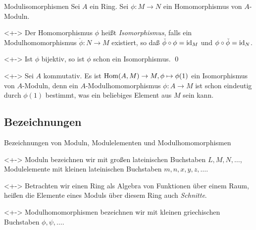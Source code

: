 \begin{frame}{Modulisomorphismen}
	Sei \(A\) ein Ring. Sei \(\phi\colon M \to N\) ein Homomorphismus
	von \(A\)-Moduln.
	\begin{definition}<+->
		Der Homomorphismus \(\phi\) heißt \emph{Isomorphismus}, falls ein
		Modulhomomorphismus \(\check \phi\colon N \to M\) existiert, so daß
		\(\check \phi \circ \phi = \operatorname{id}_M\) und \(\phi \circ \check \phi = \operatorname{id}_N\).
	\end{definition}
	\begin{proposition}<+->
		Ist \(\phi\) bijektiv, so ist \(\phi\) schon ein Isomorphismus.
		\qed
	\end{proposition}
	\begin{example}<+->
		Sei \(A\) kommutativ. Es ist
		\(\operatorname{Hom}(A, M) \to M, \phi \mapsto \phi(1)\)
		ein Isomorphismus von \(A\)-Moduln, denn ein \(A\)-Modulhomomorphismus
		\(\phi\colon A \to M\) ist schon eindeutig durch \(\phi(1)\) bestimmt, was
		ein beliebiges Element aus \(M\) sein kann.
	\end{example}
\end{frame}

\subsection{Bezeichnungen}

\begin{frame}{Bezeichnungen von Moduln, Modulelementen und Modulhomomorphismen}
	\begin{convention}<+->
		Moduln bezeichnen wir mit großen lateinischen Buchstaben \(L, M, N, \dotsc\),
		Modulelemente mit kleinen lateinischen Buchstaben \(m, n, x, y, z, \dotsc\).
	\end{convention}
	\begin{visibleenv}<+->
		Betrachten wir einen Ring als Algebra von Funktionen über einem Raum,
		heißen die Elemente eines Moduls über diesem Ring auch \emph{Schnitte}.
	\end{visibleenv}
	\begin{convention}<+->
		Modulhomomorphismen bezeichnen wir mit kleinen griechischen Buchstaben
		\(\phi, \psi, \dotsc\).
	\end{convention}
\end{frame}

